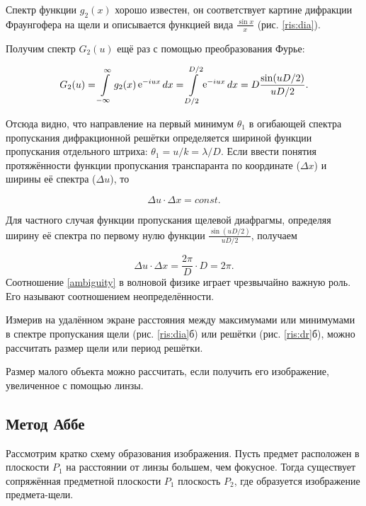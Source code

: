 \documentclass[a5paper,10pt, twoside]{article} %
\begin{document}
		
		Спектр функции $g_2(x)$ хорошо известен, он соответствует картине дифракции Фраунгофера на 
		щели и описывается функцией вида $\frac{\sin x}{x}$ (рис. \ref{ris:dia}).
		
		Получим спектр $G_2(u)$ ещё раз с помощью преобразования Фурье:
		
		\begin{displaymath}
			G_2(u) = \int\limits_{-\infty}^{\infty} g_2(x) \mathop{\mathrm e}\nolimits^{-iux} dx = \int\limits_{D / 2}^{D / 2} \mathop{\mathrm e}\nolimits^{-iux} dx = D \frac{\sin (uD / 2)}{uD / 2}.
		\end{displaymath}
		
		Отсюда видно, что направление на первый минимум $\theta_1$ в огибающей спектра пропускания 
		дифракционной решётки определяется шириной функции пропускания отдельного штриха: 
		$\theta_1 = u / k = \lambda / D$. Если ввести понятия протяжённости функции пропускания 
		транспаранта по координате ($\Delta x$) и ширины её спектра ($\Delta u$), то
		
		\begin{equation}\label{ambiguity}
			\Delta u \cdot \Delta x = const.
		\end{equation}
		
		Для частного случая функции пропускания щелевой диафрагмы, определяя ширину её спектра по 
		первому нулю функции $\frac{\sin (uD / 2)}{uD / 2}$, получаем
		
		\begin{displaymath}
		\Delta u \cdot \Delta x = \frac{2 \pi}{D} \cdot D = 2 \pi.
		\end{displaymath}
		Соотношение \eqref{ambiguity} в волновой физике играет чрезвычайно важную роль. Его называют 
		соотношением неопределённости.
		
		Измерив на удалённом экране расстояния между максимумами или минимумами в спектре пропускания 
		щели (рис. \ref{ris:dia}б) или решётки (рис. \ref{ris:dr}б), можно рассчитать размер щели или 
		период решётки.
		
		Размер малого объекта можно рассчитать, если получить его изображение, увеличенное с помощью 
		линзы.
		
	\subsection{Метод Аббе}
		
		Рассмотрим кратко схему образования изображения. Пусть предмет расположен в плоскости $P_1$ 
		на расстоянии от линзы большем, чем фокусное. Тогда существует сопряжённая предметной 
		плоскости $P_1$ плоскость $P_2$, где образуется изображение предмета-щели.
		
\end{document}
